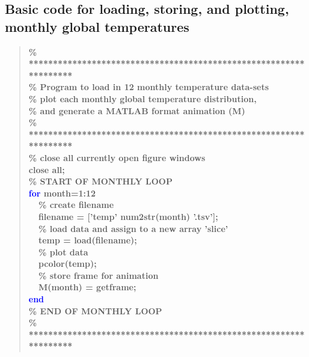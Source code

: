 \documentclass{tufte-book} %
\newenvironment{docspecbold}{\begin{quotation}\ttfamily\bfseries\parskip0pt\parindent0pt\ignorespaces}{\end{quotation}}
\begin{document}
\subsection*{Basic code for loading, storing, and plotting, monthly global temperatures}

\begin{docspecbold}
\textcolor[rgb]{0,0.501961,0}{\% ****************************************************************** 
\\\% Program to load in 12 monthly temperature data-sets
\\\% plot each monthly global temperature distribution,
\\\% and generate a MATLAB format animation (M)
\\\% ****************************************************************** 
\\\% close all currently open figure windows}
\\close \textcolor[rgb]{1,0,1}{all};
\\\textcolor[rgb]{0,0.501961,0}{\% START OF MONTHLY LOOP}
\\\textcolor{blue}{for} month=1:12
\\ \ \ \textcolor[rgb]{0,0.501961,0}{\% create filename}
\\ \ \ filename = [\textcolor[rgb]{1,0,1}{'temp'} num2str(month) \textcolor[rgb]{1,0,1}{'.tsv'}];
\\ \ \ \textcolor[rgb]{0,0.501961,0}{\% load data and assign to a new array 'slice'}
\\ \ \ temp = load(filename);
\\ \ \ \textcolor[rgb]{0,0.501961,0}{\% plot data }
\\ \ \ pcolor(temp);
\\ \ \ \textcolor[rgb]{0,0.501961,0}{\% store frame for animation }
\\ \ \ M(month) = getframe;
\\\textcolor{blue}{end}
\textcolor[rgb]{0,0.501961,0}{\\\% END OF MONTHLY LOOP
\\\% ****************************************************************** }
\end{docspecbold}
\end{document}
